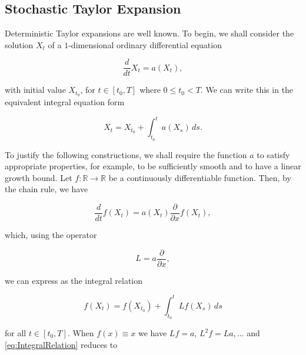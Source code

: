 \subsection{Stochastic Taylor Expansion}
\noindent Deterministic Taylor expansions are well known. To begin, we shall consider the solution \(X_t\) of a \(1\)-dimensional ordinary differential equation

\begin{equation}\label{eq:DifferentialEquation}
    \frac{d}{d t} X_t = a(X_t),
\end{equation}

\noindent with initial value \(X_{t_0}\), for \(t \in [t_0, T]\) where \(0 \leq t_0 < T\). We can write this in the equivalent integral equation form

\begin{equation}\label{eq:DeterministicIntegralEquation}
    X_t = X_{t_0} + \int_{t_0}^t a(X_s) \, ds.
\end{equation}

\noindent To justify the following constructions, we shall require the function \(a\) to satisfy appropriate properties, for example, to be sufficiently smooth and to have a linear growth bound. Let \(f : \mathbb{R} \to \mathbb{R}\) be a continuously differentiable function. Then, by the chain rule, we have

\begin{equation}\label{eq:ChainRule}
    \frac{d}{d t} f(X_t) = a(X_t) \frac{\partial}{\partial x} f(X_t),
\end{equation}

\noindent which, using the operator

\begin{equation}\label{eq:OperatorDefinition}
    L = a \frac{\partial}{\partial x},
\end{equation}

\noindent we can express as the integral relation

\begin{equation}\label{eq:IntegralRelation}
    f(X_t) = f(X_{t_0}) + \int_{t_0}^t L f(X_s) \, ds
\end{equation}

\noindent for all \(t \in [t_0, T]\). When \(f(x) \equiv x\) we have \(Lf = a\), \(L^2 f = La, \dots\) and \eqref{eq:IntegralRelation} reduces to

